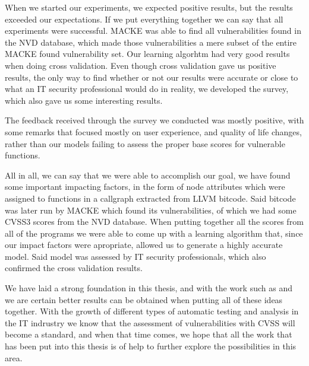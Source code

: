 When we started our experiments, we expected positive results, but the results exceeded our expectations. If we put everything together we can say that all experiments were successful. MACKE was able to find all vulnerabilities found in the NVD database, which made those vulnerabilities a mere subset of the entire MACKE found vulnerability set. Our learning algorhtm had very good results when doing cross validation. Even though cross validation gave us positive results, the only way to find whether or not our results were accurate or close to what an IT security professional would do in reality, we developed the survey, which also gave us some interesting results.

The feedback received through the survey we conducted was mostly positive, with some remarks that focused mostly on user experience, and quality of life changes, rather than our models failing to assess the proper base scores for vulnerable functions.

All in all, we can say that we were able to accomplish our goal, we have found some important impacting factors, in the form of node attributes which were assigned to functions in a callgraph extracted from LLVM bitcode. Said bitcode was later run by MACKE which found its vulnerabilities, of which we had some CVSS3 scores from the NVD database. When putting together all the scores from all of the programs we were able to come up with a learning algorithm that, since our impact factors were apropriate, allowed us to generate a highly accurate model. Said model was assessed by IT security professionals, which also confirmed the cross validation results.

We have laid a strong foundation in this thesis, and with the work such as \parencite{ognawala} and \parencite{novelty} we are certain better results can be obtained when putting all of these ideas together. With the growth of different types of automatic testing and analysis in the IT indrustry we know that the assessment of vulnerabilities with CVSS will become a standard, and when that time comes, we hope that all the work that has been put into this thesis is of help to further explore the possibilities in this area.